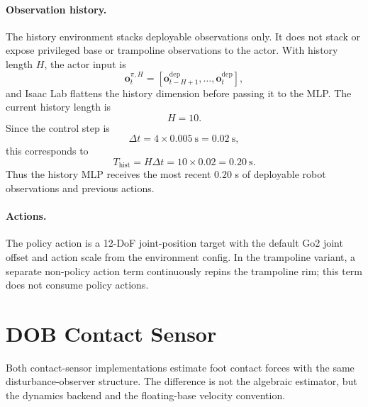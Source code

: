 \documentclass[11pt, a4paper]{article}
\begin{document}
\paragraph{Observation history.}
The history environment stacks deployable observations only. It does not stack
or expose privileged base or trampoline observations to the actor. With history
length $H$, the actor input is
\begin{equation}
    \bm{o}^{\pi,H}_t =
    \left[
        \bm{o}^{\mathrm{dep}}_{t-H+1},
        \ldots,
        \bm{o}^{\mathrm{dep}}_{t}
    \right],
\end{equation}
and Isaac Lab flattens the history dimension before passing it to the MLP. The
current history length is
\[
    H=10.
\]
Since the control step is
\[
    \Delta t = 4\times0.005\ \mathrm{s}=0.02\ \mathrm{s},
\]
this corresponds to
\[
    T_{\mathrm{hist}} = H\Delta t = 10\times0.02 = 0.20\ \mathrm{s}.
\]
Thus the history MLP receives the most recent $0.20$ s of deployable robot
observations and previous actions.

\paragraph{Actions.}
The policy action is a 12-DoF joint-position target with the default Go2 joint
offset and action scale from the environment config. In the trampoline variant,
a separate non-policy action term continuously repins the trampoline rim; this
term does not consume policy actions.

\section{DOB Contact Sensor}

Both contact-sensor implementations estimate foot contact forces with the same
disturbance-observer structure. The difference is not the algebraic estimator,
but the dynamics backend and the floating-base velocity convention.
\end{document}
